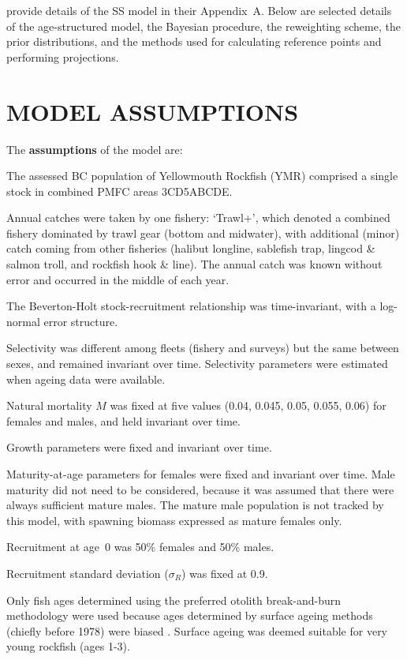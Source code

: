 \documentclass[11pt]{book}
\newcommand{\pc}{\%}
\begin{document}
\citet{Methot-Wetzel:2013} provide details of the SS model in their Appendix~A.
Below are selected details of the age-structured model, the Bayesian procedure, the reweighting scheme, the prior distributions, and the methods used for calculating reference points and performing projections.

\section{MODEL ASSUMPTIONS}

The \textbf{assumptions} of the model are:
\begin{enumerate_csas}{}{}
\item The assessed BC population of Yellowmouth Rockfish (YMR) comprised  a single stock in combined PMFC areas 3CD5ABCDE.
\item Annual catches were taken by one fishery: `Trawl+', which denoted a combined fishery dominated by trawl gear (bottom and midwater), with additional (minor) catch coming from other fisheries (halibut longline, sablefish trap, lingcod \& salmon troll, and rockfish hook \& line). The annual catch was known without error and occurred in the middle of each year.
\item The Beverton-Holt stock-recruitment relationship was time-invariant, with a log-normal error structure.
\item Selectivity was different among fleets (fishery and surveys) but the same between sexes, and remained invariant over time. Selectivity parameters were estimated when ageing data were available.
\item Natural mortality $M$ was fixed at five values (0.04, 0.045, 0.05, 0.055, 0.06) for females and males, and held invariant over time.
\item Growth parameters were fixed and invariant over time.
\item Maturity-at-age parameters for females were fixed and invariant over time. Male maturity did not need to be considered, because it was assumed that there were always sufficient mature males. The mature male population is not tracked by this model, with spawning biomass expressed as mature females only.
\item Recruitment at age~0 was 50\pc{} females and 50\pc{} males.
\item Recruitment standard deviation ($\sigma_R$) was fixed at 0.9.
\item Only fish ages determined using the preferred otolith break-and-burn methodology \citep{MacLellan:1997} were used because ages determined by surface ageing methods (chiefly before 1978) were biased \citep{Beamish:1979}. Surface ageing was deemed suitable for very young rockfish (ages 1-3).

\end{enumerate_csas}
\end{document}
